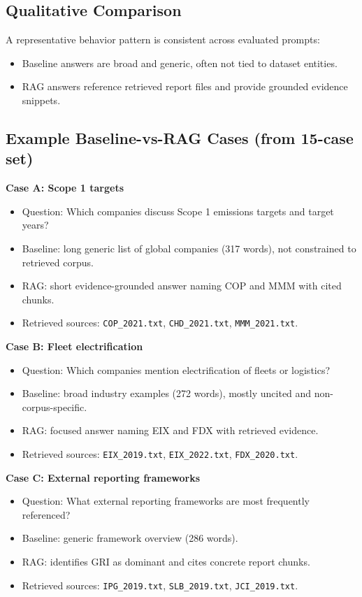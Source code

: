 \documentclass[11pt]{article}
\begin{document}
\subsection{Qualitative Comparison}
A representative behavior pattern is consistent across evaluated prompts:
\begin{itemize}
    \item Baseline answers are broad and generic, often not tied to dataset entities.
    \item RAG answers reference retrieved report files and provide grounded evidence snippets.
\end{itemize}

\subsection{Example Baseline-vs-RAG Cases (from 15-case set)}
\textbf{Case A: Scope 1 targets}
\begin{itemize}
    \item Question: Which companies discuss Scope 1 emissions targets and target years?
    \item Baseline: long generic list of global companies (317 words), not constrained to retrieved corpus.
    \item RAG: short evidence-grounded answer naming COP and MMM with cited chunks.
    \item Retrieved sources: \texttt{COP\_2021.txt}, \texttt{CHD\_2021.txt}, \texttt{MMM\_2021.txt}.
\end{itemize}

\textbf{Case B: Fleet electrification}
\begin{itemize}
    \item Question: Which companies mention electrification of fleets or logistics?
    \item Baseline: broad industry examples (272 words), mostly uncited and non-corpus-specific.
    \item RAG: focused answer naming EIX and FDX with retrieved evidence.
    \item Retrieved sources: \texttt{EIX\_2019.txt}, \texttt{EIX\_2022.txt}, \texttt{FDX\_2020.txt}.
\end{itemize}

\textbf{Case C: External reporting frameworks}
\begin{itemize}
    \item Question: What external reporting frameworks are most frequently referenced?
    \item Baseline: generic framework overview (286 words).
    \item RAG: identifies GRI as dominant and cites concrete report chunks.
    \item Retrieved sources: \texttt{IPG\_2019.txt}, \texttt{SLB\_2019.txt}, \texttt{JCI\_2019.txt}.
\end{itemize}
\end{document}
